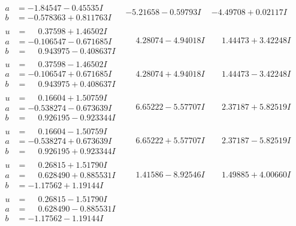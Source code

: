 \documentclass[1p]{elsarticle_modified}
\theoremstyle{definition}
\begin{document}
$$\begin{array}{c|c|c}
\begin{aligned}
a &= -1.84547 - 0.45535 I \\
b &= -0.578363 + 0.811763 I\end{aligned}
 & -5.21658 - 0.59793 I & -4.49708 + 0.02117 I \\ \hline\begin{aligned}
u &= \phantom{-}0.37598 + 1.46502 I \\
a &= -0.106547 - 0.671685 I \\
b &= \phantom{-}0.943975 - 0.408637 I\end{aligned}
 & \phantom{-}4.28074 - 4.94018 I & \phantom{-}1.44473 + 3.42248 I \\ \hline\begin{aligned}
u &= \phantom{-}0.37598 - 1.46502 I \\
a &= -0.106547 + 0.671685 I \\
b &= \phantom{-}0.943975 + 0.408637 I\end{aligned}
 & \phantom{-}4.28074 + 4.94018 I & \phantom{-}1.44473 - 3.42248 I \\ \hline\begin{aligned}
u &= \phantom{-}0.16604 + 1.50759 I \\
a &= -0.538274 - 0.673639 I \\
b &= \phantom{-}0.926195 - 0.923344 I\end{aligned}
 & \phantom{-}6.65222 - 5.57707 I & \phantom{-}2.37187 + 5.82519 I \\ \hline\begin{aligned}
u &= \phantom{-}0.16604 - 1.50759 I \\
a &= -0.538274 + 0.673639 I \\
b &= \phantom{-}0.926195 + 0.923344 I\end{aligned}
 & \phantom{-}6.65222 + 5.57707 I & \phantom{-}2.37187 - 5.82519 I \\ \hline\begin{aligned}
u &= \phantom{-}0.26815 + 1.51790 I \\
a &= \phantom{-}0.628490 + 0.885531 I \\
b &= -1.17562 + 1.19144 I\end{aligned}
 & \phantom{-}1.41586 - 8.92546 I & \phantom{-}1.49885 + 4.00660 I \\ \hline\begin{aligned}
u &= \phantom{-}0.26815 - 1.51790 I \\
a &= \phantom{-}0.628490 - 0.885531 I \\
b &= -1.17562 - 1.19144 I\end{aligned}

\end{array}$$
\end{document}
